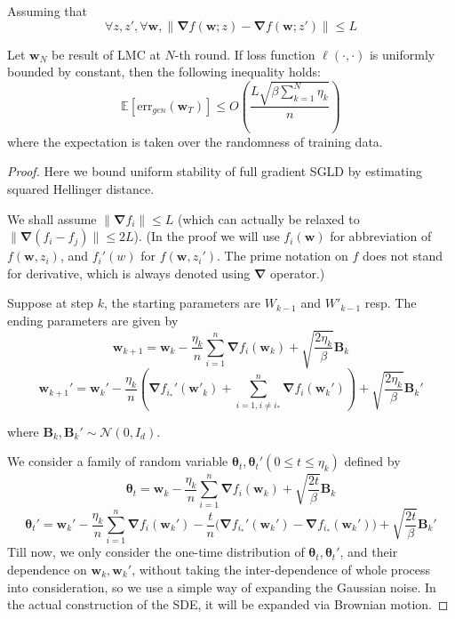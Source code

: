 \documentclass[final,12pt]{colt2018} %
\newcommand{\w}{\bm{w}}
\begin{document}
\begin{theorem}
\label{generalization LMC}
  Assuming that
  $$\forall z,z',\forall\bm{w},\|\bm{\nabla}f(\bm{w};z)-\bm{\nabla}f(\bm{w};z')\|\le L$$

  Let $\bm{w}_N$ be result of LMC at $N$-th round. If loss function $\ell(\cdot,\cdot)$ is uniformly bounded by constant, then the following inequality holds:
  \begin{equation}
    \mathbb{E}[\mathrm{err}_{gen}(\bm{w}_T)]\leq O\left(\frac{L\sqrt{\beta\sum_{k=1}^N \eta_k}}{n}\right)
  \end{equation}
  where the expectation is taken over the randomness of training data.
\end{theorem}

\begin{proof}
  Here we bound uniform stability of full gradient SGLD by estimating squared Hellinger distance.

We shall assume $\|\bm{\nabla} f_i\|\le L$ (which can actually be relaxed to $\|\bm{\nabla} (f_i-f_j)\|\le 2L$). (In the proof we will use $f_i(\w)$ for abbreviation of $f(\w,z_i)$, and $f_i'(w)$ for $f(\w,z_i')$. The prime notation on $f$ does not stand for derivative, which is always denoted using $\bm{\nabla}$ operator.)

Suppose at step $k$, the starting parameters are $W_{k-1}$ and $W'_{k-1}$ resp. The ending parameters are given by
\begin{equation}
  \bm{w}_{k+1}=\bm{w}_{k}-\frac{\eta_k}{n}\sum\limits_{i=1}^n\bm{\nabla} f_i(\bm{w}_{k})+\sqrt{\frac{2\eta_k}{\beta}}\bm{B}_k
\end{equation}
\begin{equation}
  \bm{w}_{k+1}'=\bm{w}_{k}'- \frac{\eta_k}{n}\left(\bm{\nabla} f_{i_*}'(\bm{w}'_{k})+\sum\limits_{i=1,i\neq i_*}^n\bm{\nabla} f_i(\bm{w}_{k}')\right)+\sqrt{\frac{2\eta_k}{\beta}}\bm{B}_k'
\end{equation}

where $\bm{B}_k, \bm{B}_k'\sim \mathcal{N}(0, I_d)$.

We consider a family of random variable $\bm{\theta}_t,\bm{\theta}_t'(0\le t\le \eta_k)$ defined by
\begin{equation}
  \bm{\theta}_t=\bm{w}_{k}- \frac{\eta_k}{n}\sum\limits_{i=1}^n\bm{\nabla} f_i(\bm{w}_{k})+\sqrt{\frac{2t}{\beta}}\bm{B}_k
\end{equation}
\begin{equation}
  \bm{\theta}_t'=\bm{w}_{k}'- \frac{\eta_k}{n}\sum\limits_{i=1}^n\bm{\nabla} f_i(\bm{w}_{k}')- \frac{t}{n}\Big(\bm{\nabla} f_{i_*}'(\bm{w}_k')-\bm{\nabla}f_{i_*}(\bm{w}_k')\Big)+\sqrt{\frac{2t}{\beta}}\bm{B}_k'
\end{equation}
Till now, we only consider the one-time distribution of $\bm{\theta}_t,\bm{\theta}_t'$, and their dependence on $\bm{w}_k,\bm{w}_k'$, without taking the inter-dependence of whole process into consideration, so we use a simple way of expanding the Gaussian noise. In the actual construction of the SDE, it will be expanded via Brownian motion.


\end{proof}
\end{document}
